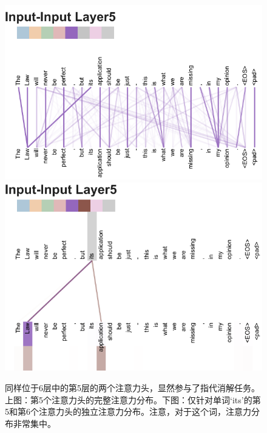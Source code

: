\documentclass[lang=cn,a4paper,newtx]{elegantpaper}
\begin{document}
\begin{figure}
{\includegraphics[width=\textwidth, trim=0 0 0 45, clip]{./vis/anaphora_resolution_new.pdf}}
{\includegraphics[width=\textwidth, trim=0 0 0 37, clip]{./vis/anaphora_resolution2_new.pdf}}
\caption{同样位于6层中的第5层的两个注意力头，显然参与了指代消解任务。上图：第5个注意力头的完整注意力分布。下图：仅针对单词`its'的第5和第6个注意力头的独立注意力分布。注意，对于这个词，注意力分布非常集中。}
\end{figure}
\end{document}
